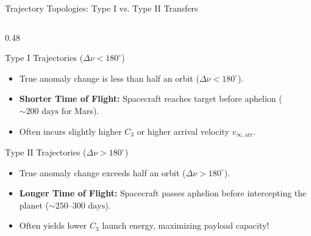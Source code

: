 \documentclass[aspectratio=169, 10pt]{beamer}
\begin{document}
\begin{frame}{Trajectory Topologies: Type I vs. Type II Transfers}
    \begin{columns}[t]
        \begin{column}{0.48\textwidth}
            \begin{block}{Type I Trajectories ($\Delta\nu < 180^\circ$)}
                \scriptsize
                \begin{itemize}\setlength{\itemsep}{1.2pt}
                    \item True anomaly change is less than half an orbit ($\Delta\nu < 180^\circ$).
                    \item \textbf{Shorter Time of Flight:} Spacecraft reaches target before aphelion ($\sim 200\text{ days}$ for Mars).
                    \item Often incurs slightly higher $C_3$ or higher arrival velocity $v_{\infty,\text{arr}}$.
                \end{itemize}
            \end{block}
            \vspace{-0.1cm}
            \begin{block}{Type II Trajectories ($\Delta\nu > 180^\circ$)}
                \scriptsize
                \begin{itemize}\setlength{\itemsep}{1.2pt}
                    \item True anomaly change exceeds half an orbit ($\Delta\nu > 180^\circ$).
                    \item \textbf{Longer Time of Flight:} Spacecraft passes aphelion before intercepting the planet ($\sim 250\text{--}300\text{ days}$).
                    \item Often yields lower $C_3$ launch energy, maximizing payload capacity!
                \end{itemize}
            \end{block}
        \end{column}


\end{columns}
\end{frame}
\end{document}
